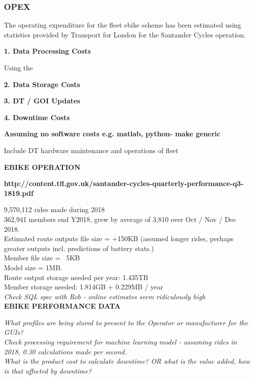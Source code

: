\documentclass[a4paper, 10pt]{article}
\numberwithin{equation}{section}
\begin{document}
\FloatBarrier
\subsubsection{OPEX}

The operating expenditure for the fleet ebike scheme has been estimated using statistics provided by Transport for London for the Santander Cycles operation.

\textbf{1. Data Processing Costs}

Using the 

\textbf{2. Data Storage Costs}

\textbf{3. DT / GOI Updates}

\textbf{4. Downtime Costs}

\textbf{Assuming no software costs e.g. matlab, python- make generic}

Include DT hardware maintenance and operations of fleet

\textbf{EBIKE OPERATION}

\textbf{http://content.tfl.gov.uk/santander-cycles-quarterly-performance-q3-1819.pdf}

9,570,112 rides made during 2018  \\
362,941 members end Y2018, grew by average of 3,810 over Oct / Nov / Dec 2018. \\
Estimated route outputs file size =  +150KB (assumed longer rides, perhaps greater outputs incl. predictions of battery stats.) \\
Member file size = ~5KB \\

Model size = 1MB. \\

Route output storage needed per year: 1.435TB \\
Member storage needed: 1.814GB + 0.229MB / year \\

\textit{Check SQL spec with Rob - online estimates seem ridiculously high} \\

\textbf{EBIKE PERFORMANCE DATA}

\textit{What profiles are being stored to present to the Operator or manufacturer for the GUIs?} \\

\textit{Check processing requirement for machine learning model - assuming rides in 2018, 0.30 calculations made per second.} \\

\textit{What is the product cost to calculate downtime? OR what is the value added, how is that affected by downtime?} \\
\end{document}

